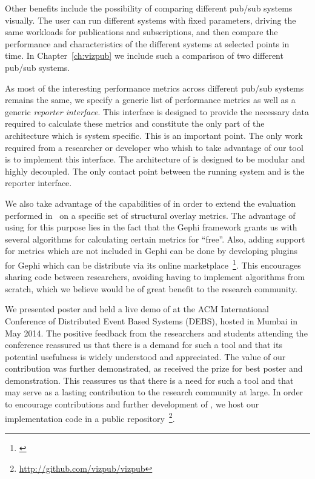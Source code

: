 Other benefits include the possibility of comparing different pub/sub
systems visually. The user can run different systems with fixed
parameters, driving the same workloads for publications and
subscriptions, and then compare the performance and characteristics of
the different systems at selected points in time. In
Chapter~\ref{ch:vizpub} we include such a comparison of two different
pub/sub systems.

As most of the interesting performance metrics across different pub/sub
systems remains the same, we specify a generic list of performance
metrics as well as a generic \emph{reporter interface}. This interface
is designed to provide the necessary data required to calculate these
metrics and constitute the only part of the architecture which is system
specific. This is an important point. The only work required from a
researcher or developer who whish to take advantage of our tool is to
implement this interface. The architecture of \demo{} is designed to be
modular and highly decoupled. The only contact point between the
running system and \demo{} is the reporter interface.

We also take advantage of the capabilities of \demo{} in order to extend
the evaluation performed in~\cite{Setty:2012} on a specific set of
structural overlay metrics. The advantage of using \demo{} for this
purpose lies in the fact that the Gephi framework grants us with
several algorithms for calculating certain metrics for ``free''. Also, adding
support for metrics which are not included in Gephi can be done by
developing plugins for Gephi which can be distribute via its online
marketplace~\footnote{\url{}}. This encourages sharing code between
researchers, avoiding having to implement algorithms from scratch, which
we believe would be of great benefit to the research community.

We presented poster and held a live demo of \demo{} at the ACM
International Conference of Distributed Event Based Systems (DEBS),
hosted in Mumbai in May 2014. The positive feedback from the researchers and
students attending the conference reassured us that there is a
demand for such a tool and that its potential usefulness is widely
understood and appreciated. The value of our contribution was further
demonstrated, as \demo{} received the prize for best poster and
demonstration. This reassures us that there is a need for such a tool
and that \demo{} may serve as a lasting contribution to the research
community at large. In order to encourage contributions and further
development of \demo{}, we host our implementation code in a public
repository~\footnote{\url{http://github.com/vizpub/vizpub}}.

